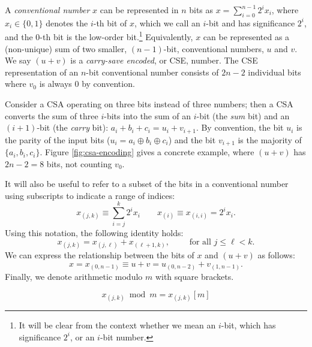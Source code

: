 A \emph{conventional number} $x$ can be represented in $n$ bits as
$x = \sum_{i=0}^{n-1} 2^i x_i$,
where $x_i \in \{0,1\}$ denotes the $i$-th bit of $x$, which we call
an $i$-bit and has significance $2^i$, and the $0$-th bit is the low-order bit.\footnote{It will be clear from the context whether we mean an
$i$-bit, which has significance $2^i$, or an $i$-bit number.}
Equivalently, $x$ can be represented as a (non-unique)
sum of two smaller, $(n-1)$-bit, conventional numbers, $u$ and $v$.
We say $(u+v)$ is a \emph{carry-save encoded}, or CSE, number.
The CSE representation of an $n$-bit conventional number
consists of $2n-2$ individual
bits where $v_0$ is always $0$ by convention.

Consider a CSA operating on three bits instead of three numbers; 
then a CSA converts the sum of three
$i$-bits into the sum of an $i$-bit (the \emph{sum} bit) and an $(i+1)$-bit
(the \emph{carry} bit):
$a_i+b_i+c_i = u_i+v_{i+1}$.
By convention, the bit $u_i$ is the parity of the input bits
($u_i = a_i \oplus b_i \oplus c_i$) and
the bit $v_{i+1}$ is the majority of $\{a_i, b_i, c_i\}$.
Figure \ref{fig:csa-encoding} gives a concrete example, where
$(u+v)$ has $2n-2 = 8$ bits, not counting $v_0$.

%
It will also be useful to refer to a subset of the bits in a conventional
number using subscripts to indicate a range of indices:
\begin{equation}
x_{(j,k)} \equiv \sum_{i=j}^k 2^ix_i \qquad
x_{(i)} \equiv x_{(i,i)} = 2^ix_i.
\end{equation}
%
Using this notation, the following identity holds:
\begin{equation}
x_{(j,k)} = x_{(j,\ell)} + x_{(\ell+1,k)}, \qquad \text{ for all } j \le \ell < k.
\end{equation}
%
We can express the relationship between the bits of $x$ and $(u+v)$ as follows:
%
\begin{equation}
x = x_{(0,n-1)} \equiv u+v = u_{(0,n-2)} + v_{(1,n-1)}.
\end{equation}
%
Finally, we denote arithmetic modulo $m$ with square brackets.

\begin{equation}
x_{(j,k)} \bmod m = x_{(j,k)}[m]
\end{equation}

